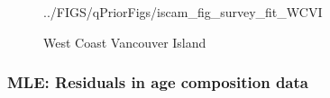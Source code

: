 \begin{frame}[t]
{\begin{figure}[htbp]
	{../FIGS/qPriorFigs/iscam_fig_survey_fit_WCVI}
		\vspace{-1cm}
		\caption{West Coast Vancouver Island}
	\end{figure}
	}
\end{frame}
%
\begin{frame}[t]\frametitle{MLE: Residuals in age composition data}
\end{frame}
